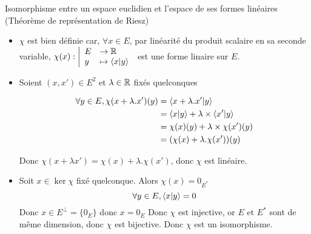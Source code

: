 \documentclass{article}
\renewenvironment{question_kholle}[2][ ]
{
	\subsection{\texorpdfstring{#2}{}}
	\notblank{#1}
	{
		\noindent #1
		\bigbreak
	}
	{}
	\begin{proof}
}
{
	\end{proof}
}
\begin{document}
\begin{question_kholle}{Isomorphisme entre un espace euclidien et l'espace de ses formes linéaires (Théorème de représentation de Riesz)}
	\begin{itemize}[label=$\star$]
		\item $\chi$ est bien définie car, $\forall x \in E$, par linéarité du produit scalaire en sa seconde variable, $\chi(x): \left|\begin{array}{ll} E &\to \mathbb R \\ y &\mapsto \braket{ x | y }  \end{array}\right.$ est une forme linaire sur $E$.


		\item Soient $(x, x') \in E^{2}$ et $\lambda \in \mathbb R$ fixés quelconques


		      \begin{align*}
			      \forall y \in E,  \chi(x + \lambda .x')(y) & = \braket{ x+\lambda.x' | y }                        \\
			                                                 & = \braket{ x | y } + \lambda \times\braket{ x' | y } \\
			                                                 & = \chi(x)(y) + \lambda \times \chi(x')(y)            \\
			                                                 & = (\chi(x) + \lambda . \chi(x') )(y)
		      \end{align*}

		      Donc $\chi(x+\lambda x') = \chi(x) + \lambda.\chi(x')$, donc $\chi$ est linéaire.

		\item Soit $x \in \ker \chi$ fixé quelconque.
		      Alors $\chi (x) = 0_{E^{*}}$
		      $$\forall y \in E, \braket{ x | y } = 0$$
		      Donc $x \in E^{\perp} = \{ 0_{E} \}$ donc $x = 0_{E}$
		      Donc $\chi$ est injective, or $E$ et $E^{*}$ sont de même dimension, donc $\chi$ est bijective.
		      Donc $\chi$ est un isomorphisme.
	\end{itemize}
\end{question_kholle}
\end{document}
